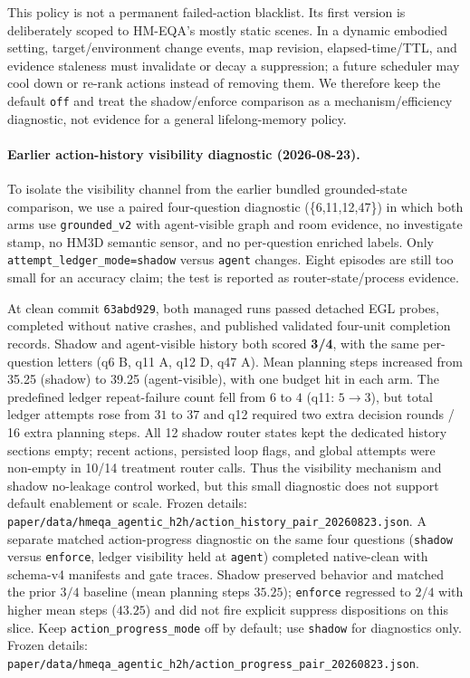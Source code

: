 This policy is not a permanent failed-action blacklist. Its first version is
deliberately scoped to HM-EQA's mostly static scenes. In a dynamic embodied
setting, target/environment change events, map revision, elapsed-time/TTL, and
evidence staleness must invalidate or decay a suppression; a future scheduler
may cool down or re-rank actions instead of removing them. We therefore keep
the default \texttt{off} and treat the shadow/enforce comparison as a
mechanism/efficiency diagnostic, not evidence for a general lifelong-memory
policy.

\paragraph{Earlier action-history visibility diagnostic (2026-08-23).}
To isolate the visibility channel from the earlier bundled grounded-state
comparison, we use a paired four-question diagnostic (\{6,11,12,47\}) in which both arms use
\texttt{grounded\_v2} with agent-visible graph and room evidence, no investigate
stamp, no HM3D semantic sensor, and no per-question enriched labels. Only
\texttt{attempt\_ledger\_mode=shadow} versus \texttt{agent} changes. Eight
episodes are still too small for an accuracy claim; the test is reported as
router-state/process evidence.

At clean commit \texttt{63abd929}, both managed runs passed detached EGL probes,
completed without native crashes, and published validated four-unit completion
records. Shadow and agent-visible history both scored \textbf{3/4}, with the
same per-question letters (q6 B, q11 A, q12 D, q47 A). Mean planning steps
increased from 35.25 (shadow) to 39.25 (agent-visible), with one budget hit in
each arm. The predefined ledger repeat-failure count fell from $6$ to $4$
(q11: $5\!\rightarrow\!3$), but total ledger attempts rose from $31$ to $37$
and q12 required two extra decision rounds / 16 extra planning steps. All 12
shadow router states kept the dedicated history sections empty; recent actions,
persisted loop flags, and global attempts were non-empty in 10/14 treatment
router calls. Thus the visibility mechanism and shadow no-leakage control
worked, but this small diagnostic does not support default enablement or scale.
Frozen details:
\texttt{paper/data/hmeqa\_agentic\_h2h/action\_history\_pair\_20260823.json}.
A separate matched action-progress diagnostic on the same four questions
(\texttt{shadow} versus \texttt{enforce}, ledger visibility held at
\texttt{agent}) completed native-clean with schema-v4 manifests and gate traces.
Shadow preserved behavior and matched the prior $3/4$ baseline (mean planning
steps $35.25$); \texttt{enforce} regressed to $2/4$ with higher mean steps
($43.25$) and did not fire explicit suppress dispositions on this slice. Keep
\texttt{action\_progress\_mode} off by default; use \texttt{shadow} for
diagnostics only. Frozen details:
\texttt{paper/data/hmeqa\_agentic\_h2h/action\_progress\_pair\_20260823.json}.

